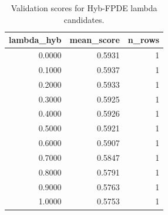 \begin{table}[t]
\caption{Validation scores for Hyb-FPDE lambda candidates.}
\label{tab:lambda_distribution_computed}
\centering
\begin{tabular}{rrr}
\toprule
lambda\_hyb & mean\_score & n\_rows \\
\midrule
0.0000 & 0.5931 & 1 \\
0.1000 & 0.5937 & 1 \\
0.2000 & 0.5933 & 1 \\
0.3000 & 0.5925 & 1 \\
0.4000 & 0.5926 & 1 \\
0.5000 & 0.5921 & 1 \\
0.6000 & 0.5907 & 1 \\
0.7000 & 0.5847 & 1 \\
0.8000 & 0.5791 & 1 \\
0.9000 & 0.5763 & 1 \\
1.0000 & 0.5753 & 1 \\
\bottomrule
\end{tabular}

\end{table}
